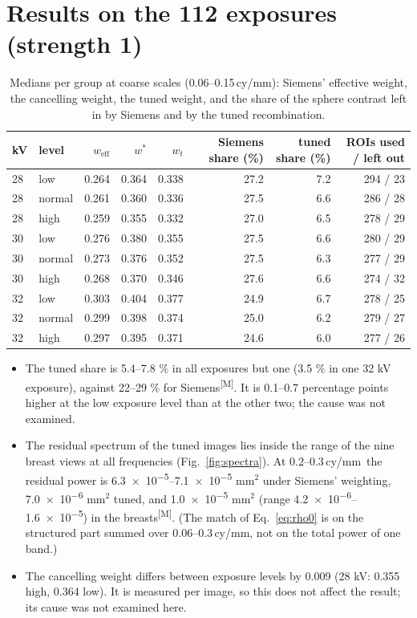 \documentclass[11pt,a4paper]{article}
\newcommand{\weff}{w_\mathrm{eff}}
\newcommand{\ws}{w^{*}}
\newcommand{\wt}{w_t}
\newcommand{\M}{\textsuperscript{[M]}}
\newcommand{\cymm}{\,cy/mm}
\begin{document}
\section{Results on the 112 exposures (strength 1)}\label{sec:results}

\begin{table}[H]\centering\small
\caption{Medians per group at coarse scales (0.06--0.15\cymm): Siemens' effective weight, the cancelling weight, the
tuned weight, and the share of the sphere contrast left in by Siemens and by the tuned recombination.}\label{tab:results}
\begin{tabular}{llrrrrrr}
\toprule
kV & level & $\weff$ & $\ws$ & $\wt$ & Siemens share (\%) & tuned share (\%) & ROIs used / left out \\
\midrule
28 & low    & 0.264 & 0.364 & 0.338 & 27.2 & 7.2 & 294 / 23 \\
28 & normal & 0.261 & 0.360 & 0.336 & 27.5 & 6.6 & 286 / 28 \\
28 & high   & 0.259 & 0.355 & 0.332 & 27.0 & 6.5 & 278 / 29 \\
30 & low    & 0.276 & 0.380 & 0.355 & 27.5 & 6.6 & 280 / 29 \\
30 & normal & 0.273 & 0.376 & 0.352 & 27.5 & 6.3 & 277 / 29 \\
30 & high   & 0.268 & 0.370 & 0.346 & 27.6 & 6.6 & 274 / 32 \\
32 & low    & 0.303 & 0.404 & 0.377 & 24.9 & 6.7 & 278 / 25 \\
32 & normal & 0.299 & 0.398 & 0.374 & 25.0 & 6.2 & 279 / 27 \\
32 & high   & 0.297 & 0.395 & 0.371 & 24.6 & 6.0 & 277 / 26 \\
\bottomrule
\end{tabular}
\end{table}

\begin{itemize}
\item The tuned share is 5.4--7.8 \% in all exposures but one (3.5 \% in one 32 kV exposure), against 22--29 \% for
Siemens\M. It is 0.1--0.7 percentage points higher at the low exposure level than at the other two; the cause was
not examined.
\item The residual spectrum of the tuned images lies inside the range of the nine breast views at all frequencies
(Fig.~\ref{fig:spectra}). At 0.2--0.3\cymm\ the residual power is \num{6.3e-5}--\num{7.1e-5} mm$^2$ under Siemens'
weighting, \num{7.0e-6} mm$^2$ tuned, and \num{1.0e-5} mm$^2$ (range \num{4.2e-6}--\num{1.6e-5}) in the
breasts\M. (The match of Eq.~\eqref{eq:rho0} is on the structured part summed over 0.06--0.3\cymm, not on the total
power of one band.)
\item The cancelling weight differs between exposure levels by 0.009 (28 kV: 0.355 high, 0.364 low). It is measured
per image, so this does not affect the result; its cause was not examined here.
\end{itemize}
\end{document}
